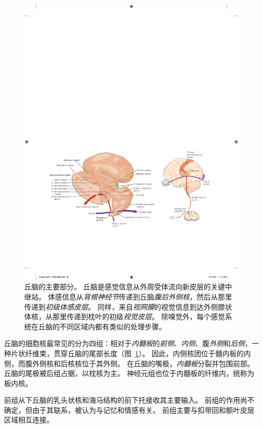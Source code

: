 \begin{figure}[htbp]
	\centering
	\includegraphics[width=1.0\linewidth]{chap04/fig_4_7}
	\caption{丘脑的主要部分。
		丘脑是感觉信息从外周受体流向新皮层的关键中继站。
		体感信息从\textit{背根神经节}传递到丘脑\textit{腹后外侧核}，然后从那里传递到\textit{初级体感皮层}。
		同样，来自\textit{视网膜}的视觉信息到达外侧膝状体核，从那里传递到枕叶的初级\textit{视觉皮层}。
		除嗅觉外，每个感觉系统在丘脑的不同区域内都有类似的处理步骤。}
	\label{fig:4_7}
\end{figure}


丘脑的细胞核最常见的分为四组：相对于\textit{内髓板}的\textit{前侧}、\textit{内侧}、腹\textit{外侧}和\textit{后侧}，一种片状纤维束，贯穿丘脑的尾部长度（图~\ref{fig:4_7}）。
因此，内侧核团位于髓内板的内侧，而腹外侧核和后核核位于其外侧。
在丘脑的嘴极，\textit{内髓板}分裂并包围前部。
丘脑的尾极被后组占据，以枕核为主。
神经元组也位于内髓板的纤维内，统称为板内核。


前组从下丘脑的乳头状核和海马结构的前下托接收其主要输入。 
前组的作用尚不确定，但由于其联系，被认为与记忆和情感有关。 
前组主要与扣带回和额叶皮层区域相互连接。


